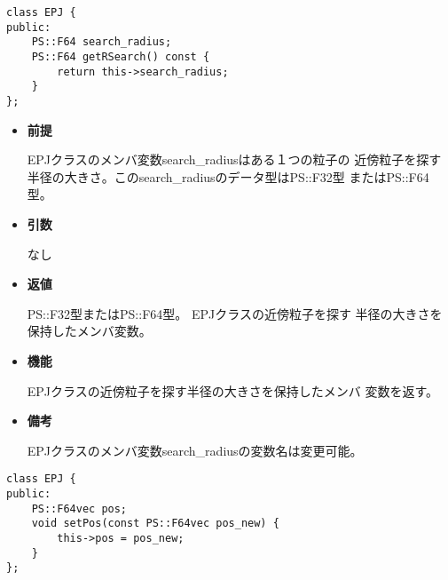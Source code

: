 

\begin{screen}
\begin{verbatim}
class EPJ {
public:
    PS::F64 search_radius;
    PS::F64 getRSearch() const {
        return this->search_radius;
    }
};
\end{verbatim}
\end{screen}

\begin{itemize}

\item {\bf 前提}

  EPJクラスのメンバ変数search\_radiusはある１つの粒子の
  近傍粒子を探す半径の大きさ。このsearch\_radiusのデータ型はPS::F32型
  またはPS::F64型。
  
\item {\bf 引数}

  なし
  
\item {\bf 返値}

  PS::F32型またはPS::F64型。 EPJクラスの近傍粒子を探す
  半径の大きさを保持したメンバ変数。
  
\item {\bf 機能}

  EPJクラスの近傍粒子を探す半径の大きさを保持したメンバ
  変数を返す。

\item {\bf 備考}

  EPJクラスのメンバ変数search\_radiusの変数名は変更可能。
  
\end{itemize}



\begin{screen}
\begin{verbatim}
class EPJ {
public:
    PS::F64vec pos;
    void setPos(const PS::F64vec pos_new) {
        this->pos = pos_new;
    }
};
\end{verbatim}
\end{screen}

